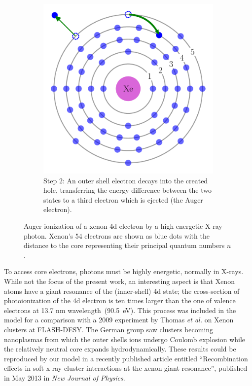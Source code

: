 \begin{figure}
\begin{subfigure}{0.48\columnwidth}
        \centering
        \includegraphics[width=\textwidth]{figures/auger_step_2}
        \caption{Step 2: An outer shell electron decays into the created hole,
                 transferring the energy difference between the two states to a
                 third electron which is ejected (the Auger electron).}
        \label{fig:auger:2}
    \end{subfigure}
        \caption{\label{fig:auger}Auger ionization of a xenon 4d electron by a
                 high energetic X-ray photon. Xenon's 54 electrons are shown
                 as blue dots with the distance to the core representing their
                 principal quantum numbers $n$.}
\end{figure}

To access core electrons, photons must be highly energetic, normally in X-rays.
While not the focus of the present work, an interesting aspect is that Xenon
atoms have a giant resonance of the (inner-shell) 4d state; the cross-section of
photoionization of the 4d electron is ten times larger than the
one of valence  electrons at 13.7 nm wavelength~(90.5~eV)\cite{Becker1986}.
This process was included in the model for a comparison with a 2009 experiment
by Thomas \textit{et al.}\cite{Thomas2009} on Xenon clusters at FLASH-DESY.
The German group saw clusters becoming nanoplasmas from which the outer shells
ions undergo Coulomb explosion while the relatively neutral core expands
hydrodynamically. These results could be reproduced by our model in a recently
published article entitled ``Recombination effects in soft-x-ray cluster
interactions at the xenon giant resonance'', published in May 2013 in
\textit{New Journal of Physics}\cite{Ackad2013}.

